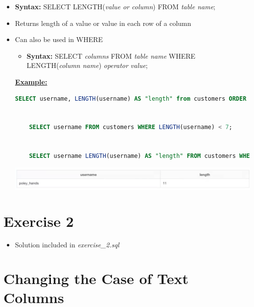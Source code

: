 \documentclass[12pt]{article}
\begin{document}
\begin{itemize}
    \item \textbf{Syntax:} SELECT LENGTH(\textit{value or column}) FROM \textit{table name};
    \item Returns length of a value or value in each row of a column
    \item Can also be used in WHERE
    \begin{itemize}
        \item \textbf{Syntax:} SELECT \textit{columns} FROM \textit{table name} WHERE LENGTH(\textit{column name}) \textit{operator} \textit{value};
    \end{itemize}

    \bigskip

    \underline{\textbf{Example:}}

    \bigskip

    \begin{lstlisting}[language=SQL]
    SELECT username, LENGTH(username) AS "length" from customers ORDER BY length DESC LIMIT 1;


    SELECT username FROM customers WHERE LENGTH(username) < 7;


    SELECT username LENGTH(username) AS "length" FROM customers WHERE length < 7;
    \end{lstlisting}

    \bigskip

    \begin{center}
    \includegraphics[width=\linewidth]{images/part_2_notes_2.png}
    \end{center}

\end{itemize}

\bigskip

\section{Exercise 2}

\bigskip

\begin{itemize}
    \item Solution included in \textit{exercise\_2.sql}
\end{itemize}

\bigskip

\section{Changing the Case of Text Columns}
\end{document}
